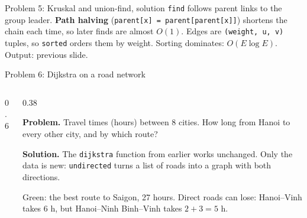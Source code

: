 \documentclass[aspectratio=169,10pt]{beamer}
\newcommand{\pyouts}[2]{}
\begin{document}
\begin{frame}[allowframebreaks]{Problem 5: Kruskal and union-find, solution}
\vspace{2mm}
{\small
\texttt{find} follows parent links to the group leader. \textbf{Path halving} (\texttt{parent[x] = parent[parent[x]]}) shortens the chain each time, so later finds are almost $O(1)$.}
\framebreak
{}
\vspace{2mm}
{\small
Edges are \texttt{(weight, u, v)} tuples, so \texttt{sorted} orders them by weight. Sorting dominates: $O(E\log E)$. Output: previous slide.}
\end{frame}

\begin{frame}{Problem 6: Dijkstra on a road network}
\begin{columns}[T]
\begin{column}{0.6\textwidth}
\begin{sfig}[0.55]
\end{sfig}
\vspace{1mm}
\pyouts{\fontsize{6.9}{8.4}}{network_demo}
\end{column}
\begin{column}{0.38\textwidth}
{\small
\textbf{Problem.} Travel times (hours) between 8 cities. How long from Hanoi to every other city, and by which route?

\vspace{2mm}
\textbf{Solution.} The \texttt{dijkstra} function from earlier works unchanged. Only the data is new: \texttt{undirected} turns a list of roads into a graph with both directions.

\vspace{2mm}
Green: the best route to Saigon, 27 hours. Direct roads can lose: Hanoi--Vinh takes 6 h, but Hanoi--Ninh Binh--Vinh takes $2+3=5$ h.}
\end{column}
\end{columns}
\end{frame}
\end{document}
